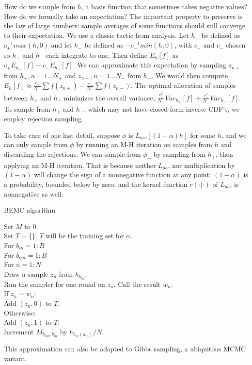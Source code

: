 \documentclass{article}
\begin{document}
How do we sample from $h$, a basis function that sometimes takes negative values? How do we formally take an expectation? The important property to preserve is the law of large numbers: sample averages of some functions should still converge to their expectation. We use a classic tactic from analysis. Let $h_+$ be defined as $c_+^{-1}max(h, 0)$ and let $h_-$ be defined as $-c_-^{-1}min(h, 0)$, with $c_+$ and $c_-$ chosen so $h_+$ and $h_-$ each integrate to one. Then define $E_{h}[f]$ as $c_+E_{h_+}[f]-c_-E_{h_-}[f]$. We can approximate this expectation by sampling $z_{n+}$ from $h_+, n=1...N_+$ and $z_{n-}, n=1...N_-$ from $h_-$. We would then compute $E_{h}[f] \approx \frac{c_+}{N_+}\sum f(z_{n+})-\frac{c_-}{N_-}\sum f(z_{n-})$. The optimal allocation of samples between $h_+$ and $h_-$ minimizes the overall variance, $\frac{c_+^2}{N_+}Var_{h_+}[f] + \frac{c_-^2}{N_-}Var_{h_-}[f]$. To sample from $h_+$ and $h_-$, which may not have closed-form inverse CDF's, we employ rejection sampling. 

To take care of one last detail, suppose $\phi$ is $L_{acc}[(1-\alpha)h]$ for some $h$, and we can only sample from $\phi$ by running an M-H iteration on samples from $h$ and discarding the rejections. We can sample from $\phi_+$ by sampling from $h_+$, then applying an M-H iteration. That is because neither $L_{acc}$ nor multiplication by $(1-\alpha)$ will change the sign of a nonnegative function at any point: $(1-\alpha)$ is a probability, bounded below by zero, and the kernel function $r(\cdot | \cdot)$ of $L_{acc}$ is nonnegative as well. 

\begin{algorithm}[h]
\caption{BEMC algorithm}
Set $M$ to $0$.\\
Set $T = \{\}$. $T$ will be the training set for $\alpha$.\\
For $b_{in}  = 1:B$\\
\Indp
For $b_{out}  = 1:B$\\
\Indp
For $n = 1:N$\\
\Indp
Draw a sample $z_n$ from $h_{b_{in}}$.\\
Run the sampler for one round on $z_n$. Call the result $w_n$.\\
If $z_n = w_n$:\\
\Indp
Add $(z_n, 0)$ to $T$.\\
\Indm
Otherwise:\\
\Indp
Add $(z_n, 1)$ to $T$.\\
Increment $M_{b_{out}, b_{in}}$ by $h_{b_{in}(w_n)}/N$.\\
\end{algorithm}


This approximation can also be adapted to Gibbs sampling, a ubiquitous MCMC variant. 



\end{document}

